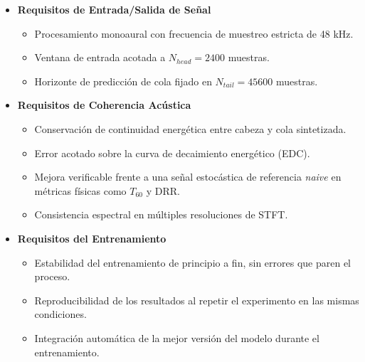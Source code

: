 \begin{itemize}
    \item \textbf{Requisitos de Entrada/Salida de Señal}
    \begin{itemize}
        \item Procesamiento monoaural con frecuencia de muestreo estricta de 48 kHz.
        \item Ventana de entrada acotada a $N_{head}=2400$ muestras.
        \item Horizonte de predicción de cola fijado en $N_{tail}=45600$ muestras.
    \end{itemize}

    \item \textbf{Requisitos de Coherencia Acústica}
    \begin{itemize}
        \item Conservación de continuidad energética entre cabeza y cola sintetizada.
        \item Error acotado sobre la curva de decaimiento energético (EDC).
        \item Mejora verificable frente a una señal estocástica de referencia \textit{naive} en métricas físicas como $T_{60}$ y DRR.
        \item Consistencia espectral en múltiples resoluciones de STFT.
    \end{itemize}

    \item \textbf{Requisitos del Entrenamiento}
    \begin{itemize}
        \item Estabilidad del entrenamiento de principio a fin, sin errores que paren el proceso.
        \item Reproducibilidad de los resultados al repetir el experimento en las mismas condiciones.
        \item Integración automática de la mejor versión del modelo durante el entrenamiento.
    \end{itemize}
\end{itemize}

